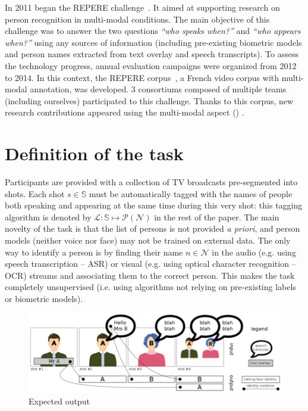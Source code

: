 \documentclass{acm_proc_article-me}
\newcommand\shots{\mathbb{S}}
\newcommand\hypLabels{\mathcal{L}}
\newcommand\hypNames{\mathcal{N}}
\begin{document}
In 2011 began the REPERE challenge~\cite{BERNARD--SLAM--2013, KAHN--CBMI--2012}. It aimed at supporting research on person recognition in multi-modal conditions. The main objective of this challenge was to answer the two questions \emph{``who speaks when?''} and \emph{``who appears when?''} using any sources of information (including pre-existing biometric models and person names extracted from text overlay and speech transcripts). To assess the technology progress, annual evaluation campaigns were organized from 2012 to 2014. In this context, the REPERE corpus~\cite{GIRAUDEL--LREC--2012}, a French video corpus with multi-modal annotation, was developed. 3 consortiums composed of multiple teams (including ourselves) participated to this challenge. Thanks to this corpus, new research contributions appeared using the multi-modal aspect (\cite{BECHET--INTERSPEECH--2014, BENDRIS--CBMI--2013, BREDIN--ODYSSEY--2014, BREDIN--INTERSPEECH--2013, BREDIN--SLAM--2013, BREDIN--IJMIR--2014, FAVRE--SLAM--2013, GAY--CBMI--2014, POIGNANT--ASLP--2015, POIGNANT--SLAM--2013, POIGNANT--INTERSPEECH--2012, POIGNANT--MTAP--2015, ROUVIER--CBMI--2014})  .

\section{Definition of the task}

Participants are provided with a collection of TV broadcasts pre-segmented into shots.
Each shot $s \in \shots$ must be automatically tagged with the names of people both speaking and appearing at the same time during this very shot: this tagging algorithm is denoted by $\hypLabels : \shots \mapsto \mathcal{P}(\hypNames)$ in the rest of the paper.
The main novelty of the task is that the list of persons is not provided \emph{a priori}, and person models (neither voice nor face) may not be trained on external data. The only way to identify a person is by finding their name $n \in \hypNames$ in the audio (e.g. using speech transcription -- ASR) or visual (e.g. using optical character recognition -- OCR) streams and associating them to the correct person.
This makes the task completely unsupervised (i.e. using algorithms not relying on pre-existing labels or biometric models).

\begin{figure}[!htb]
 \center
 \includegraphics[width=1\linewidth]{figs/evidence.png}
 \centering
 \caption {Expected output}
 \label{fig:evidence}
\end{figure}
\end{document}
